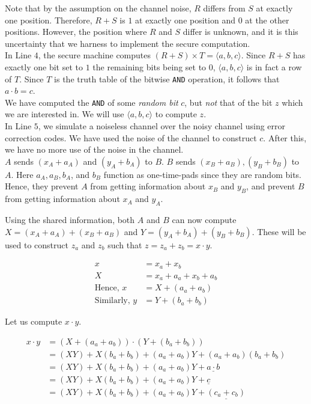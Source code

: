 \documentclass[11pt]{article}
\begin{document}
\pagebreak

Note that by the assumption on the channel noise, $R$ differs from $S$ at exactly one position. Therefore, $R + S$ is $1$ at exactly one position and $0$ at the other positions. However, the position where $R$ and $S$ differ is unknown, and it is this uncertainty that we harness to implement the secure computation. \\

In Line $4$, the secure machine computes $(R + S) \times T = \langle a, b, c \rangle $. Since $R + S$ has exactly one bit set to $1$ the remaining bits being set to $0$, $\langle a, b, c \rangle$ is in fact a row of $T$. Since $T$ is the truth table of the bitwise \texttt{AND} operation, it follows that $a \cdot b = c$. \\

We have computed the \texttt{AND} of some \textit{random bit} $c$, but \textit{not} that of the bit $z$ which we are interested in. We will use $\langle a, b, c \rangle$ to compute $z$. \\

In Line $5$, we simulate a noiseless channel over the noisy channel using error correction codes. We have used the noise of the channel to construct $c$. After this, we have no more use of the noise in the channel. \\

$A$ sends $(x_A + a_A)$ and $(y_A + b_A)$ to $B$. $B$ sends $(x_B + a_B), (y_B + b_B)$ to $A$. Here $a_A, a_B, b_A$, and $b_B$ function as one-time-pads since they are random bits. Hence, they prevent $A$ from getting information about $x_B$ and $y_B$, and prevent $B$ from getting information about $x_A$ and $y_A$.

Using the shared information, both $A$ and $B$ can now compute $X = (x_A + a_A) + (x_B + a_B)$ and $Y = (y_A + b_A) + (y_B + b_B)$. These will be used to construct $z_a$ and $z_b$ such that $z = z_a + z_b = x \cdot y$.

\begin{align*}
x &= x_a + x_b \\
X &= x_a + a_a + x_b + a_b \\
\text{Hence, } x &= X + (a_a + a_b) \\
\text{Similarly, } y &= Y + (b_a + b_b) 
\end{align*}
  
Let us compute $x \cdot y$.

\begin{align*}
x  \cdot y &= (X + (a_a + a_b)) \cdot (Y + (b_a + b_b)) \\
&= (XY) + X(b_a + b_b) + (a_a + a_b)Y +  (a_a + a_b) (b_a + b_b) \\
&= (XY) + X(b_a + b_b) + (a_a + a_b)Y +  \underline{a \cdot b} \\
&= (XY) + X(b_a + b_b) + (a_a + a_b)Y +  \underline{c} \\
&= (XY) + X(b_a + b_b) + (a_a + a_b)Y +  \underline{(c_a + c_b)}
\end{align*}
\end{document}
